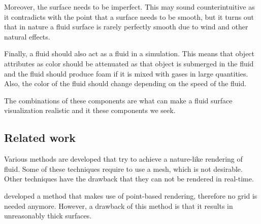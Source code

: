 Moreover, the surface needs to be imperfect. This may sound counterintuitive as it contradicts with the point that a surface needs to be smooth, but it turns out that in nature a fluid surface is rarely perfectly smooth due to wind and other natural effects.

Finally, a fluid should also act as a fluid in a simulation. This means that object attributes as color should be attenuated as that object is submerged in the fluid and the fluid should produce foam if it is mixed with gases in large quantities. Also, the color of the fluid should change depending on the speed of the fluid.

The combinations of these components are what can make a fluid surface visualization realistic and it these components we seek.
\subsection{Related work}
Various methods are developed that try to achieve a nature-like rendering of fluid.
Some of these techniques require to use a mesh, which is not desirable.
Other techniques have the drawback that they can not be rendered in real-time.

\cite{zhang2008adaptive} developed a method that makes use of point-based rendering, therefore no grid is needed anymore.
However, a drawback of this method is that it results in unreasonably thick surfaces.

